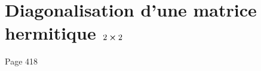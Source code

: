 \chapter{Diagonalisation d'une matrice hermitique $2 \cross 2$}
\label{diagonalisation_matrice_hermitique_2x2}
Page 418
